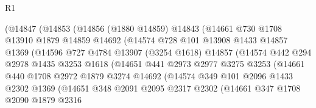 \begin{lexlean}{R1}
\begin{coremodule}
                    (@14847
                      (@14853
                        (@14856
                          (@1880 @14859)
                          @14843
                          (@14661
                            @730
                            @1708
                            @13910
                            @1879
                            @14859
                            @14692
                            (@14574
                              @728
                              @101
                              @13908
                              @1433
                              @14857
                              @1369
                              (@14596
                                @727
                                @4784
                                @13907
                                (@3254 @1618)
                                @14857
                                (@14574
                                  @442
                                  @294
                                  @2978
                                  @1435
                                  @3253
                                  @1618
                                  (@14651
                                    @441
                                    @2973
                                    @2977
                                    @3275
                                    @3253
                                    (@14661
                                      @440
                                      @1708
                                      @2972
                                      @1879
                                      @3274
                                      @14692
                                      (@14574
                                        @349
                                        @101
                                        @2096
                                        @1433
                                        @2302
                                        @1369
                                        (@14651
                                          @348
                                          @2091
                                          @2095
                                          @2317
                                          @2302
                                          (@14661
                                            @347
                                            @1708
                                            @2090
                                            @1879
                                            @2316

\end{coremodule}
\end{lexlean}

